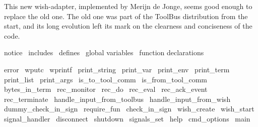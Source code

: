 

This new wish-adapter, implemented by Merijn de Jonge, seems good
enough to replace the old one. The old one was part of the ToolBus
distribution from the start, and its long evolution left its mark
on the clearness and conciseness of the code.

\endmoddef\let\nwnotused=\nwoutput{}
\LA{}notice~{\nwtagstyle{}}\RA{}
\LA{}includes~{\nwtagstyle{}}\RA{}
\LA{}defines~{\nwtagstyle{}}\RA{}
\LA{}global variables~{\nwtagstyle{}}\RA{}
\LA{}function declarations~{\nwtagstyle{}}\RA{}

\LA{}error~{\nwtagstyle{}}\RA{}
\LA{}wputc~{\nwtagstyle{}}\RA{}
\LA{}wprintf~{\nwtagstyle{}}\RA{}
\LA{}print_string~{\nwtagstyle{}}\RA{}
\LA{}print_var~{\nwtagstyle{}}\RA{}
\LA{}print_env~{\nwtagstyle{}}\RA{}
\LA{}print_term~{\nwtagstyle{}}\RA{}
\LA{}print_list~{\nwtagstyle{}}\RA{}
\LA{}print_args~{\nwtagstyle{}}\RA{}
\LA{}is_to_tool_comm~{\nwtagstyle{}}\RA{}
\LA{}is_from_tool_comm~{\nwtagstyle{}}\RA{}
\LA{}bytes_in_term~{\nwtagstyle{}}\RA{}
\LA{}rec_monitor~{\nwtagstyle{}}\RA{}
\LA{}rec_do~{\nwtagstyle{}}\RA{}
\LA{}rec_eval~{\nwtagstyle{}}\RA{}
\LA{}rec_ack_event~{\nwtagstyle{}}\RA{}
\LA{}rec_terminate~{\nwtagstyle{}}\RA{}
\LA{}handle_input_from_toolbus~{\nwtagstyle{}}\RA{}
\LA{}handle_input_from_wish~{\nwtagstyle{}}\RA{}
\LA{}dummy_check_in_sign~{\nwtagstyle{}}\RA{}
\LA{}require_fun~{\nwtagstyle{}}\RA{}
\LA{}check_in_sign~{\nwtagstyle{}}\RA{}
\LA{}wish_create~{\nwtagstyle{}}\RA{}
\LA{}wish_start~{\nwtagstyle{}}\RA{}
\LA{}signal_handler~{\nwtagstyle{}}\RA{}
\LA{}disconnect~{\nwtagstyle{}}\RA{}
\LA{}shutdown~{\nwtagstyle{}}\RA{}
\LA{}signals_set~{\nwtagstyle{}}\RA{}
\LA{}help~{\nwtagstyle{}}\RA{}
\LA{}cmd_options~{\nwtagstyle{}}\RA{}
\LA{}main~{\nwtagstyle{}}\RA{}

